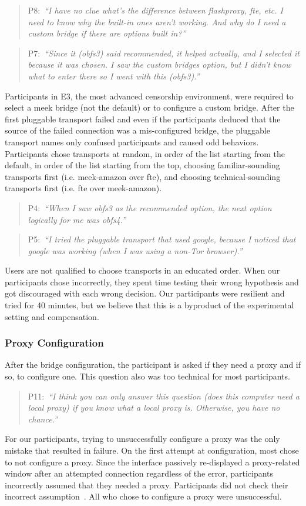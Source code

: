 \documentclass[USenglish,oneside,twocolumn]{article}
\newcommand{\pquote}[2]{
\begin{quotation}
\noindent #1:~\textit{``#2''}
\end{quotation}
}
\begin{document}
\pquote{P8}{I have no clue what's the difference between flashproxy, fte, etc. I need to know why the built-in ones aren't working. And why do I need a custom bridge if there are options built in?}
\pquote{P7}{Since it (obfs3) said recommended, it helped actually, and I selected it because it was chosen. I saw the custom bridges option, but I didn't know what to enter there so I went with this (obfs3).}

Participants in E3, the most advanced censorship environment, were required to select a meek bridge (not the default) or to configure a custom bridge. After the first pluggable transport failed and even if the participants deduced that the source of the failed connection was a mis-configured bridge, the pluggable transport names only confused participants and caused odd behaviors. Participants chose transports at random, in order of the list starting from the default, in order of the list starting from the top, choosing familiar-sounding transports first (i.e. meek-amazon over fte), and choosing technical-sounding transports first (i.e. fte over meek-amazon). 

\pquote{P4}{When I saw obfs3 as the recommended option, the next option logically for me was obfs4.}
\pquote{P5}{I tried the pluggable transport that used google, because I noticed that google was working (when I was using a non-Tor browser).}

Users are not qualified to choose transports in an educated order. When our participants chose incorrectly, they spent time testing their wrong hypothesis and got discouraged with each wrong decision. Our participants were resilient and tried for 40 minutes, but we believe that this is a byproduct of the experimental setting and compensation.

\subsubsection{Proxy Configuration} 
After the bridge configuration, the participant is asked if they need a proxy and if so, to configure one. This question also was too technical for most participants.

\pquote{P11}{I think you can only answer this question (does this computer need a local proxy) if you know what a local proxy is. Otherwise, you have no chance.}

For our participants, trying to unsuccessfully configure a proxy was the only mistake that resulted in failure. On the first attempt at configuration, most chose to not configure a proxy. Since the interface passively re-displayed a proxy-related window after an attempted connection regardless of the error, participants incorrectly assumed that they needed a proxy. Participants did not check their incorrect assumption~\cite{wason1960failure}. All who chose to configure a proxy were unsuccessful. 
\end{document}
